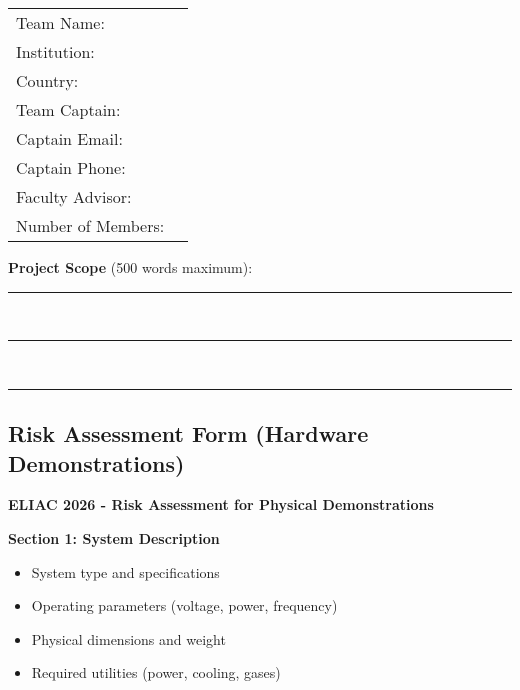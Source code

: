 \vspace{1em}
\begin{tabular}{ll}
Team Name: & \underline{\hspace{8cm}} \\[0.5em]
Institution: & \underline{\hspace{8cm}} \\[0.5em]
Country: & \underline{\hspace{8cm}} \\[0.5em]
Team Captain: & \underline{\hspace{8cm}} \\[0.5em]
Captain Email: & \underline{\hspace{8cm}} \\[0.5em]
Captain Phone: & \underline{\hspace{8cm}} \\[0.5em]
Faculty Advisor: & \underline{\hspace{8cm}} \\[0.5em]
Number of Members: & \underline{\hspace{8cm}} \\[0.5em]
\end{tabular}

\vspace{1em}
\noindent\textbf{Project Scope} (500 words maximum):\\
\noindent\rule{\textwidth}{0.5pt}\\
\noindent\rule{\textwidth}{0.5pt}\\
\noindent\rule{\textwidth}{0.5pt}

\subsection{Risk Assessment Form (Hardware Demonstrations)}

\noindent\textbf{ELIAC 2026 - Risk Assessment for Physical Demonstrations}

\vspace{1em}
\noindent\textbf{Section 1: System Description}
\begin{itemize}[noitemsep]
    \item System type and specifications
    \item Operating parameters (voltage, power, frequency)
    \item Physical dimensions and weight
    \item Required utilities (power, cooling, gases)
\end{itemize}

